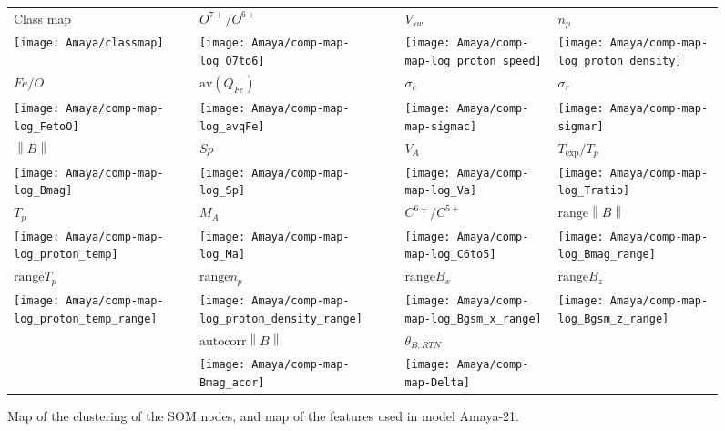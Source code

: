 \documentclass[utf8]{frontiersSCNS} %
\begin{document}
\begin{figure}[h!]\centering
	\begin{tabular}{CCCC}
		Class map & $O^{7+}/O^{6+}$ & $V_{sw}$ & $n_p$ \\
		\texttt{[image: Amaya/classmap]} &
		\texttt{[image: Amaya/comp-map-log\_O7to6]} &
		\texttt{[image: Amaya/comp-map-log\_proton\_speed]} &
		\texttt{[image: Amaya/comp-map-log\_proton\_density]}\hfill
		\\
		$Fe/O$ & $\text{av}(Q_{Fe})$ & $\sigma_c$ & $\sigma_r$ \\
		\texttt{[image: Amaya/comp-map-log\_FetoO]} &
		\texttt{[image: Amaya/comp-map-log\_avqFe]} &
		\texttt{[image: Amaya/comp-map-sigmac]} &
		\texttt{[image: Amaya/comp-map-sigmar]}\hfill
		\\
		$\left\lVert B \right\rVert $ & $Sp$ & $V_{A}$ & $T_{\text{exp}}/T_p$ \\
		\texttt{[image: Amaya/comp-map-log\_Bmag]} &
		\texttt{[image: Amaya/comp-map-log\_Sp]} &
		\texttt{[image: Amaya/comp-map-log\_Va]} &
		\texttt{[image: Amaya/comp-map-log\_Tratio]}\hfill
		\\
		$T_p$ & $M_A$ & $C^{6+}/C^{5+}$ & $\text{range} \left\lVert B \right\rVert $ \\
		\texttt{[image: Amaya/comp-map-log\_proton\_temp]} &
		\texttt{[image: Amaya/comp-map-log\_Ma]} &
		\texttt{[image: Amaya/comp-map-log\_C6to5]} &
		\texttt{[image: Amaya/comp-map-log\_Bmag\_range]}\hfill
		\\
		$\text{range} T_p $ & $\text{range} n_p$ & $\text{range} B_x$ & $\text{range} B_z$ \\
		\texttt{[image: Amaya/comp-map-log\_proton\_temp\_range]} &
		\texttt{[image: Amaya/comp-map-log\_proton\_density\_range]} &
		\texttt{[image: Amaya/comp-map-log\_Bgsm\_x\_range]} &
		\texttt{[image: Amaya/comp-map-log\_Bgsm\_z\_range]}\hfill
		\\
		& $\text{autocorr} \left\lVert B \right\rVert$ & $\theta_{B,RTN}$ & \\
		& \texttt{[image: Amaya/comp-map-Bmag\_acor]} &
		\texttt{[image: Amaya/comp-map-Delta]} & \hfill
		\\
	\end{tabular}
	\caption{Map of the clustering of the SOM nodes, and map of the features used in model Amaya-21.}\label{fig:compmap}
\end{figure}
\end{document}
